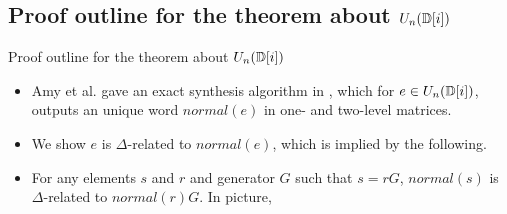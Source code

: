 \documentclass[compress,noamsthm,hyperref={bookmarksopen=true},aspectratio=169]{beamer}
\begin{document}
\subsection{Proof outline for the theorem about $U_n({\mathbb D} [i])$}
\begin{frame}[fragile]{Proof outline for the theorem about $U_n({\mathbb D} [i])$}
  \begin{itemize}
  \item Amy et al. gave an exact synthesis algorithm in
    \cite{Amy-Glaudell-Ross}, which for $e \in U_n({\mathbb D} [i])$, outputs an
    unique word $normal(e)$ in one- and two-level matrices.
  \item We show $e$ is $\Delta$-related to $normal(e)$, which is
    implied by the following.
  \item For any elements $s$ and $r$ and generator $G$ such that
    $s=rG$, $normal(s)$ is $\Delta$-related to $normal(r)G$. In
    picture,
    

\end{itemize}
\end{frame}
\end{document}
